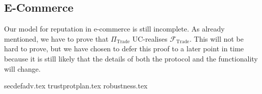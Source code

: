 \subsection{E-Commerce}
  Our model for reputation in e-commerce is still incomplete. As already mentioned, we
  have to prove that $\Pi_{\mathrm{Trade}}$ UC-realises $\mathcal{F}_{\mathrm{Trade}}$.
  This will not be hard to prove, but we have chosen to defer this proof to a later point
  in time because it is still likely that the details of both the protocol and the
  functionality will change.

  {secdefadv.tex}
  {trustprotplan.tex}
  {robustness.tex}
